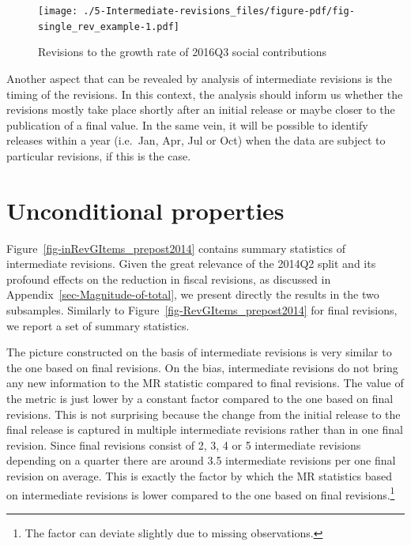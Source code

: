 \documentclass[
  letterpaper,
  authoryear,
  preprint,
  3p]{elsarticle}
\begin{document}
\begin{figure}[H]

{\centering \texttt{[image: ./5-Intermediate-revisions\_files/figure-pdf/fig-single\_rev\_example-1.pdf]}

}

\caption{\label{fig-single_rev_example}Revisions to the growth rate of
2016Q3 social contributions}

\end{figure}

Another aspect that can be revealed by analysis of intermediate
revisions is the timing of the revisions. In this context, the analysis
should inform us whether the revisions mostly take place shortly after
an initial release or maybe closer to the publication of a final value.
In the same vein, it will be possible to identify releases within a year
(i.e.~Jan, Apr, Jul or Oct) when the data are subject to particular
revisions, if this is the case.

\hypertarget{unconditional-properties}{%
\section{Unconditional properties}\label{unconditional-properties}}

Figure~\ref{fig-inRevGItems_prepost2014} contains summary statistics of
intermediate revisions. Given the great relevance of the 2014Q2 split
and its profound effects on the reduction in fiscal revisions, as
discussed in Appendix~\ref{sec-Magnitude-of-total}, we present directly
the results in the two subsamples. Similarly to
Figure~\ref{fig-RevGItems_prepost2014} for final revisions, we report a
set of summary statistics.

The picture constructed on the basis of intermediate revisions is very
similar to the one based on final revisions. On the bias, intermediate
revisions do not bring any new information to the MR statistic compared
to final revisions. The value of the metric is just lower by a constant
factor compared to the one based on final revisions. This is not
surprising because the change from the initial release to the final
release is captured in multiple intermediate revisions rather than in
one final revision. Since final revisions consist of 2, 3, 4 or 5
intermediate revisions depending on a quarter there are around 3.5
intermediate revisions per one final revision on average. This is
exactly the factor by which the MR statistics based on intermediate
revisions is lower compared to the one based on final
revisions.\footnote{The factor can deviate slightly due to missing
  observations.}
\end{document}
